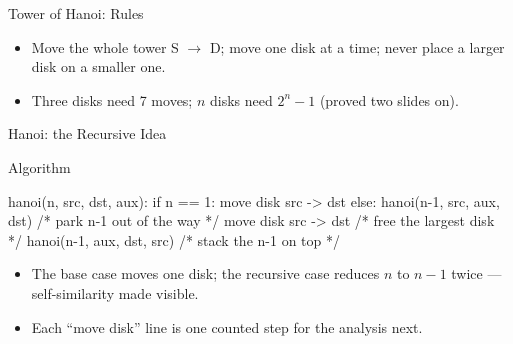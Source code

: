 \documentclass[aspectratio=169]{beamer}
\begin{document}
\begin{frame}{Tower of Hanoi: Rules}
  \begin{center}
  \end{center}
  \begin{itemize}
    \item Move the whole tower S $\to$ D; move one disk at a time; never
      place a larger disk on a smaller one.
    \item Three disks need 7 moves; $n$ disks need $2^{n} - 1$ (proved two
      slides on).
  \end{itemize}
\end{frame}

\begin{frame}[fragile]{Hanoi: the Recursive Idea}
  \begin{block}{Algorithm}
\begin{semiverbatim}
hanoi(n, src, dst, aux):
    if n == 1: move disk src -> dst
    else:
        hanoi(n-1, src, aux, dst)   /* park n-1 out of the way */
        move disk src -> dst        /* free the largest disk */
        hanoi(n-1, aux, dst, src)   /* stack the n-1 on top */
\end{semiverbatim}
  \end{block}
  \begin{itemize}
    \item The base case moves one disk; the recursive case reduces $n$ to
      $n - 1$ twice --- self-similarity made visible.
    \item Each ``move disk'' line is one counted step for the analysis next.
  \end{itemize}
\end{frame}
\end{document}

